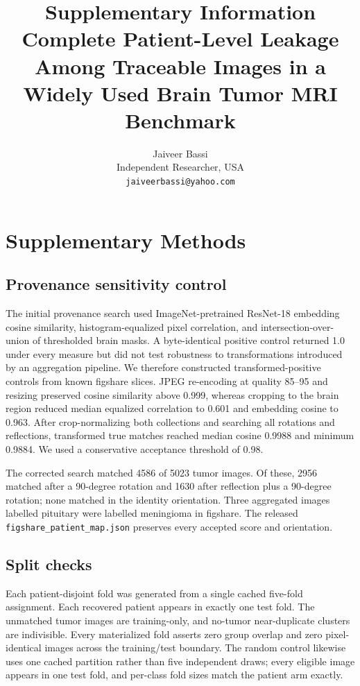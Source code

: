 ﻿\documentclass[11pt]{article}
\title{\textbf{Supplementary Information}\\[4pt]
\large Complete Patient-Level Leakage Among Traceable Images in a Widely Used Brain Tumor MRI Benchmark}
\author{Jaiveer Bassi\\Independent Researcher, USA\\\texttt{jaiveerbassi@yahoo.com}}
\date{}
\begin{document}
\maketitle

\section*{Supplementary Methods}
\subsection*{Provenance sensitivity control}
The initial provenance search used ImageNet-pretrained ResNet-18 embedding cosine similarity, histogram-equalized pixel correlation, and intersection-over-union of thresholded brain masks. A byte-identical positive control returned 1.0 under every measure but did not test robustness to transformations introduced by an aggregation pipeline. We therefore constructed transformed-positive controls from known figshare slices. JPEG re-encoding at quality 85--95 and resizing preserved cosine similarity above 0.999, whereas cropping to the brain region reduced median equalized correlation to 0.601 and embedding cosine to 0.963. After crop-normalizing both collections and searching all rotations and reflections, transformed true matches reached median cosine 0.9988 and minimum 0.9884. We used a conservative acceptance threshold of 0.98.

The corrected search matched 4586 of 5023 tumor images. Of these, 2956 matched after a 90-degree rotation and 1630 after reflection plus a 90-degree rotation; none matched in the identity orientation. Three aggregated images labelled pituitary were labelled meningioma in figshare. The released \texttt{figshare\_patient\_map.json} preserves every accepted score and orientation.

\subsection*{Split checks}
Each patient-disjoint fold was generated from a single cached five-fold assignment. Each recovered patient appears in exactly one test fold. The unmatched tumor images are training-only, and no-tumor near-duplicate clusters are indivisible. Every materialized fold asserts zero group overlap and zero pixel-identical images across the training/test boundary. The random control likewise uses one cached partition rather than five independent draws; every eligible image appears in one test fold, and per-class fold sizes match the patient arm exactly.
\end{document}
